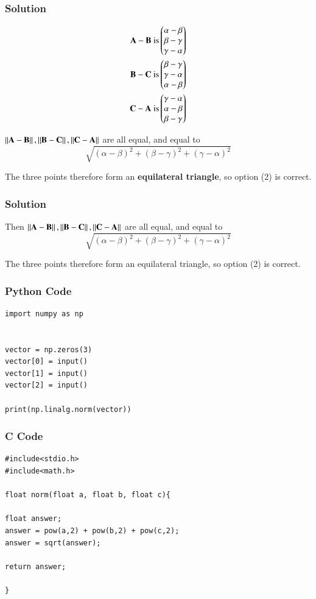 \documentclass{beamer}
\begin{document}
\begin{frame}[fragile]
    \frametitle{Solution}
\begin{align}
\mathbf{A-B} \text{ is} \begin{pmatrix}\alpha - \beta \\ \beta - \gamma \\ \gamma - \alpha\end{pmatrix} \\
\mathbf{B-C} \text{ is} \begin{pmatrix}\beta - \gamma \\ \gamma - \alpha \\ \alpha - \beta\end{pmatrix} \\
\mathbf{C-A} \text{ is} \begin{pmatrix}\gamma - \alpha \\ \alpha - \beta \\ \beta - \gamma\end{pmatrix}
\end{align}


$\left\lVert\mathbf{A}-\mathbf{B}\right\rVert, \left\lVert\mathbf{B}-\mathbf{C}\right\rVert, \left\lVert\mathbf{C}-\mathbf{A}\right\rVert$ are all equal, and equal to
$$\sqrt{(\alpha - \beta)^2  + (\beta - \gamma)^2 + (\gamma - \alpha)^2}$$

The three points therefore form an \textbf{equilateral triangle}, so option (2) is correct.

\end{frame}


\begin{frame}[fragile]
    \frametitle{Solution}

Then $\left\lVert\mathbf{A-B}\right\rVert, \left\lVert\mathbf{B-C}\right\rVert, \left\lVert\mathbf{C-A}\right\rVert$ are all equal, and equal to
$$\sqrt{(\alpha - \beta)^2  + (\beta - \gamma)^2 + (\gamma - \alpha)^2}$$


The three points therefore form an equilateral triangle, so option (2) is correct.

\end{frame}


\begin{frame}[fragile]
    \frametitle{Python Code}
    \begin{lstlisting}
import numpy as np


vector = np.zeros(3)
vector[0] = input()
vector[1] = input()
vector[2] = input()

print(np.linalg.norm(vector))

\end{lstlisting}

\end{frame}


\begin{frame}[fragile]
\frametitle{C Code}
\begin{lstlisting}
#include<stdio.h>
#include<math.h>

float norm(float a, float b, float c){

float answer;
answer = pow(a,2) + pow(b,2) + pow(c,2);
answer = sqrt(answer);

return answer;

}
\end{lstlisting}

\end{frame}
\end{document}
